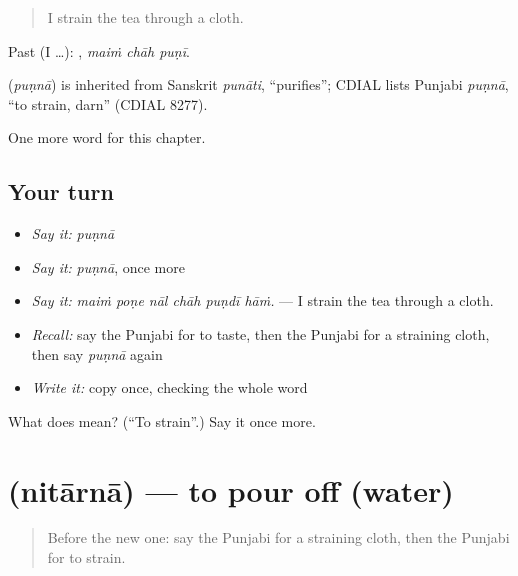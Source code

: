 \begin{quote}
I strain the tea through a cloth.
\end{quote}

Past (I …):   , \emph{maiṁ chāh puṇī}.

\begin{cousinweb}
\textbf{} (\emph{puṇnā}) is inherited from Sanskrit \emph{punāti}, \textquotedblleft{}purifies\textquotedblright{}; CDIAL lists Punjabi \emph{puṇnā}, \textquotedblleft{}to strain, darn\textquotedblright{} (CDIAL 8277).
\end{cousinweb}

\begin{grammarlens}[title={What you've built}]
One more word for this chapter.
\end{grammarlens}

\subsection*{Your turn}
\begin{itemize}
\raggedright
  \item \emph{Say it:} \emph{puṇnā}
  \item \emph{Say it:} \emph{puṇnā}, once more
  \item \emph{Say it:} \emph{maiṁ poṇe nāl chāh puṇdī hāṁ.} — I strain the tea through a cloth.
  \item \emph{Recall:} say the Punjabi for to taste, then the Punjabi for a straining cloth, then say \emph{puṇnā} again
  \item \emph{Write it:} copy \textbf{} once, checking the whole word
\end{itemize}

\begin{tcolorbox}[breakable,colback=teal!4,colframe=teal!35!black,title={Before you move on}]
What does  mean? (\textquotedblleft{}To strain\textquotedblright{}.) Say it once more.
\end{tcolorbox}
\section[\texorpdfstring{\pa{ਨਿਤਾਰਨਾ} (nitārnā)}{ਨਿਤਾਰਨਾ (nitārnā)}]{ (nitārnā) — to pour off (water)}

\label{lesson:PA-C244-nitarna}



\begin{quote}
Before the new one: say the Punjabi for a straining cloth, then the Punjabi for to strain.
\end{quote}

